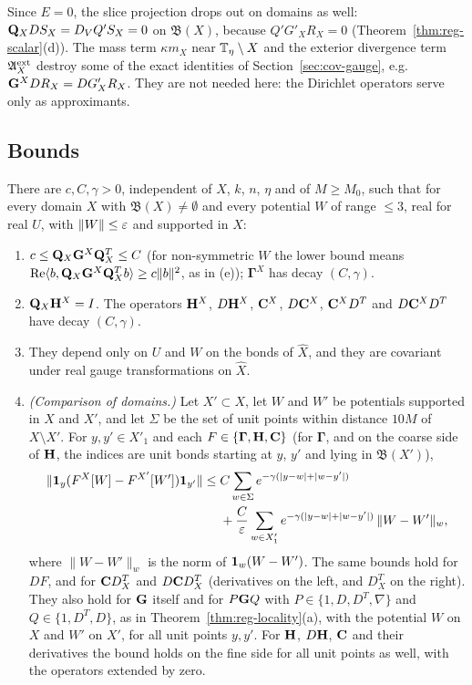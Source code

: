 Since $E=0$, the slice projection drops out on domains as well: $\mathbf Q_XDS_X=D_VQ'S_X=0$ on $\mathfrak B(X)$, because $Q'G'_XR_X=0$ (Theorem~\ref{thm:reg-scalar}(d)). The mass term $\kappa m_X$ near $\mathbb T_\eta\setminus X$ and the exterior divergence term $\mathfrak A^{\rm ext}_X$ destroy some of the exact identities of Section~\ref{sec:cov-gauge}, e.g.\ $\mathbf G^XDR_X=DG'_XR_X$. They are not needed here: the Dirichlet operators serve only as approximants.

\subsection{Bounds}\label{ss:35.2}

\begin{proposition}\label{prop:dirichlet-averaged}
There are $c,C,\gamma>0$, independent of $X$, $k$, $n$, $\eta$ and of $M\ge M_0$, such that for every domain $X$ with $\mathfrak B(X)\ne\emptyset$ and every potential $W$ of range $\le3$, real for real $U$, with $\|W\|\le\varepsilon$ and supported in $X$:
\begin{enumerate}[label=(\alph*)]
\item $c\le\mathbf Q_X\mathbf G^X\mathbf Q_X^T\le C$ (for non-symmetric $W$ the lower bound means $\operatorname{Re}\langle b,\mathbf Q_X\mathbf G^X\mathbf Q_X^Tb\rangle\ge c\|b\|^2$, as in (e)); $\boldsymbol\Gamma^X$ has decay $(C,\gamma)$.
\item $\mathbf Q_X\mathbf H^X=I$. The operators $\mathbf H^X$, $D\mathbf H^X$, $\mathbf C^X$, $D\mathbf C^X$, $\mathbf C^XD^T$ and $D\mathbf C^XD^T$ have decay $(C,\gamma)$.
\item They depend only on $U$ and $W$ on the bonds of $\hat X$, and they are covariant under real gauge transformations on $\hat X$.
\item \emph{(Comparison of domains.)} Let $X'\subset X$, let $W$ and $W'$ be potentials supported in $X$ and $X'$, and let $\Sigma$ be the set of unit points within distance $10M$ of $X\setminus X'$. For $y,y'\in X'_1$ and each $F\in\{\boldsymbol\Gamma,\mathbf H,\mathbf C\}$ (for $\boldsymbol\Gamma$, and on the coarse side of $\mathbf H$, the indices are unit bonds starting at $y$, $y'$ and lying in $\mathfrak B(X')$),
\[
\begin{aligned}
\|\mathbf 1_y(F^X[W]-F^{X'}[W'])\mathbf 1_{y'}\|\le{}&C\sum_{w\in\Sigma}e^{-\gamma(|y-w|+|w-y'|)}\\
&+\frac C{\varepsilon}\sum_{w\in X'_1}e^{-\gamma(|y-w|+|w-y'|)}\,\|W-W'\|_w ,
\end{aligned}
\]
where $\|W-W'\|_w$ is the norm of $\mathbf 1_w(W-W')$. The same bounds hold for $DF$, and for $\mathbf C D^T_X$ and $D\mathbf C D^T_X$ (derivatives on the left, and $D^T_X$ on the right). They also hold for $\mathbf G$ itself and for $P\mathbf G Q$ with $P\in\{1,D,D^T,\nabla\}$ and $Q\in\{1,D^T,D\}$, as in Theorem~\ref{thm:reg-locality}(a), with the potential $W$ on $X$ and $W'$ on $X'$, for all unit points $y,y'$. For $\mathbf H$, $D\mathbf H$, $\mathbf C$ and their derivatives the bound holds on the fine side for all unit points as well, with the operators extended by zero.

\end{enumerate}
\end{proposition}
